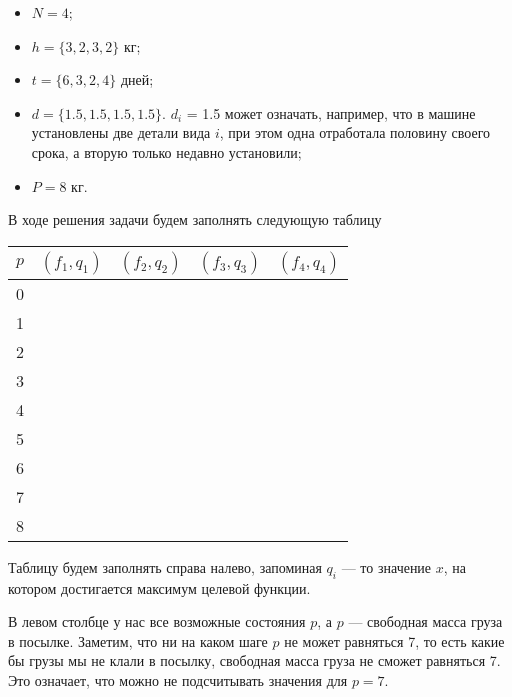 \begin{itemize}[nosep]
	\item $N = 4$;
	
	\item $h = \{3, 2, 3, 2\}$ кг;
	
	\item $t = \{6, 3, 2, 4\}$ дней;
	
	\item $d = \{1.5, 1.5, 1.5, 1.5\}$. $d_i$ = 1.5 может означать, например, что в машине установлены две детали вида $i$, при этом одна отработала половину своего срока, а вторую только недавно установили;
	
	\item $P = 8$ кг.
\end{itemize}

\bigskip

В ходе решения задачи будем заполнять следующую таблицу

\begin{table}[H]
	\centering
	\begin{tabular}{ | c | c | c | c | c | } 
		\hline
		$p$ & $(f_1, q_1)$ & $(f_2, q_2)$ & $(f_3, q_3)$ & $(f_4, q_4)$ \\ 
		\hline
		0 & & & & \\\hline
		1 & & & & \\\hline
		2 & & & &\\\hline
		3 & & & & \\\hline
		4 & & & & \\\hline
		5 & & & & \\\hline
		6 & & & & \\\hline
		7 & & & & \\\hline
		8 & & & & \\\hline
	\end{tabular}
\end{table}

Таблицу будем заполнять справа налево, запоминая $q_i$ --- то значение $x$, на котором достигается максимум целевой функции.

В левом столбце у нас все возможные состояния $p$, а $p$ --- свободная масса груза в посылке. Заметим, что ни на каком шаге $p$ не может равняться 7, то есть какие бы грузы мы не клали в посылку, свободная масса груза не сможет равняться 7. Это означает, что можно не подсчитывать значения для $p = 7$.

